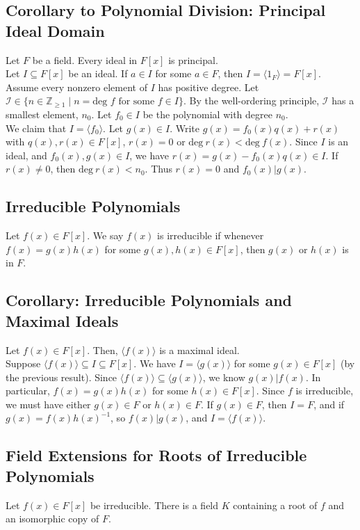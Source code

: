 \documentclass[8pt]{extarticle}
\newcommand{\Z}{\mathbb{Z}}
\begin{document}
  \subsection{Corollary to Polynomial Division: Principal Ideal Domain}%
  Let $F$ be a field. Every ideal in $F[x]$ is principal.\\

  Let $I\subseteq F[x]$ be an ideal. If $a\in I$ for some $a\in F$, then $I = \langle 1_F\rangle = F[x]$. Assume every nonzero element of $I$ has positive degree. Let $\mathcal{I}\in \{n\in \Z_{\geq 1}\mid n = \text{deg $f$ for some $f\in I$}\}$. By the well-ordering principle, $\mathcal{I}$ has a smallest element, $n_0$. Let $f_0\in I$ be the polynomial with degree $n_0$.\\

  We claim that $I = \langle f_0 \rangle$. Let $g(x)\in I$. Write $g(x) = f_0(x)q(x) + r(x)$ with $q(x),r(x)\in F[x]$, $r(x) = 0$ or $\text{deg}~r(x) < \text{deg}~f(x)$. Since $I$ is an ideal, and $f_0(x),g(x)\in I$, we have $r(x) = g(x)-f_0(x)q(x)\in I$. If $r(x) \neq 0$, then $\text{deg}~r(x) < n_0$. Thus $r(x) = 0$ and $f_0(x) | g(x)$.
  \subsection{Irreducible Polynomials}%
  Let $f(x) \in F[x]$. We say $f(x)$ is irreducible if whenever $f(x) = g(x)h(x)$ for some $g(x),h(x)\in F[x]$, then $g(x)$ or $h(x)$ is in $F$. 
  \subsection{Corollary: Irreducible Polynomials and Maximal Ideals}%
  Let $f(x) \in F[x]$. Then, $\langle f(x) \rangle$ is a maximal ideal.\\

  Suppose $\langle f(x) \rangle\subseteq I\subseteq F[x]$. We have $I = \langle g(x)\rangle$ for some $g(x)\in F[x]$ (by the previous result). Since $\langle f(x)\rangle \subseteq \langle g(x)\rangle$, we know $g(x)|f(x)$. In particular, $f(x) = g(x)h(x)$ for some $h(x)\in F[x]$. Since $f$ is irreducible, we must have either $g(x)\in F$ or $h(x)\in F$. If $g(x)\in F$, then $I = F$, and if $g(x) = f(x)h(x)^{-1}$, so $f(x)|g(x)$, and $I = \langle f(x)\rangle$.
  \subsection{Field Extensions for Roots of Irreducible Polynomials}%
  Let $f(x) \in F[x]$ be irreducible. There is a field $K$ containing a root of $f$ and an isomorphic copy of $F$.\\
\end{document}
